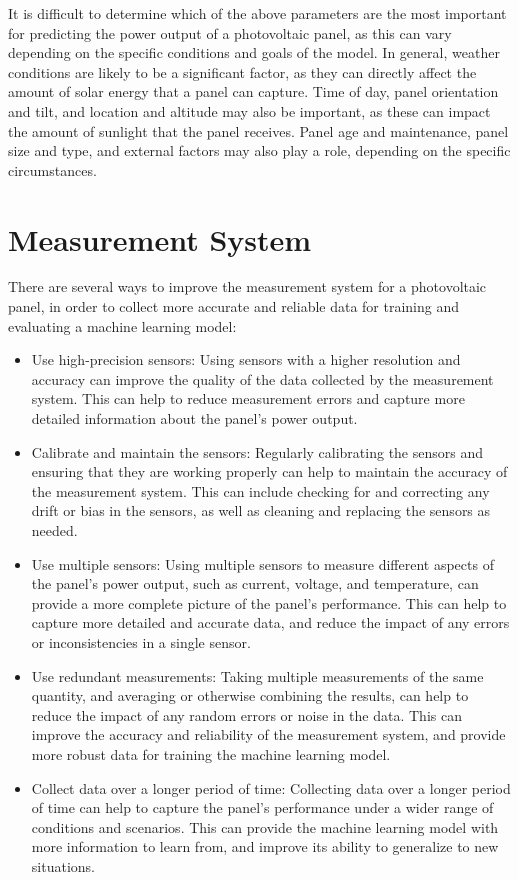 \documentclass{report}
\begin{document}
It is difficult to determine which of the above parameters are the most important for predicting the power output of a photovoltaic panel, as this can vary depending on the specific conditions and goals of the model. In general, weather conditions are likely to be a significant factor, as they can directly affect the amount of solar energy that a panel can capture. Time of day, panel orientation and tilt, and location and altitude may also be important, as these can impact the amount of sunlight that the panel receives. Panel age and maintenance, panel size and type, and external factors may also play a role, depending on the specific circumstances.
\section{Measurement System}
There are several ways to improve the measurement system for a photovoltaic panel, in order to collect more accurate and reliable data for training and evaluating a machine learning model:
\begin{itemize}
    \item Use high-precision sensors: Using sensors with a higher resolution and accuracy can improve the quality of the data collected by the measurement system. This can help to reduce measurement errors and capture more detailed information about the panel's power output.
    \item Calibrate and maintain the sensors: Regularly calibrating the sensors and ensuring that they are working properly can help to maintain the accuracy of the measurement system. This can include checking for and correcting any drift or bias in the sensors, as well as cleaning and replacing the sensors as needed.
    \item Use multiple sensors: Using multiple sensors to measure different aspects of the panel's power output, such as current, voltage, and temperature, can provide a more complete picture of the panel's performance. This can help to capture more detailed and accurate data, and reduce the impact of any errors or inconsistencies in a single sensor.
    \item Use redundant measurements: Taking multiple measurements of the same quantity, and averaging or otherwise combining the results, can help to reduce the impact of any random errors or noise in the data. This can improve the accuracy and reliability of the measurement system, and provide more robust data for training the machine learning model.
    \item Collect data over a longer period of time: Collecting data over a longer period of time can help to capture the panel's performance under a wider range of conditions and scenarios. This can provide the machine learning model with more information to learn from, and improve its ability to generalize to new situations.
\end{itemize}
\newpage
\end{document}
